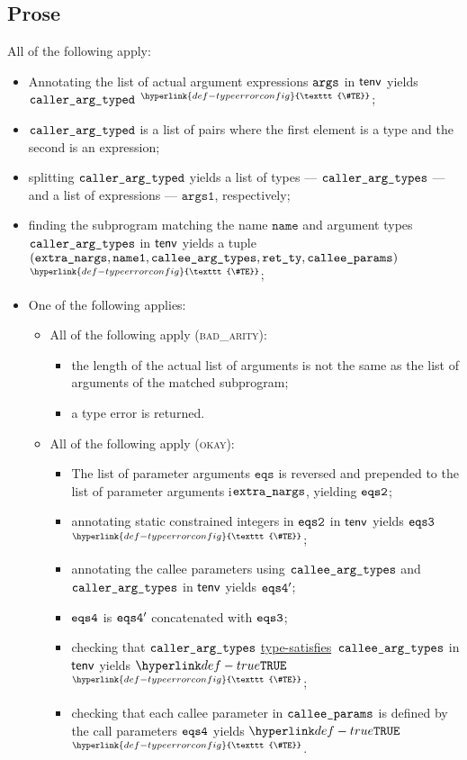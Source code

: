 \documentclass{book}
\newcommand\TypeErrorConfig[0]{\hyperlink{def-typeerrorconfig}{\texttt{\#TE}}}
\newcommand\ProseOrTypeError[0]{\hyperlink{def-proseortypeerror}{$^{\TypeErrorConfig}$}}
\newcommand\typesatisfies[0]{\hyperlink{def-typesatisfies}{type-satisfies}}
\newcommand\eqs[0]{\texttt{eqs}}
\newcommand\nameone[0]{\texttt{name1}}
\newcommand\vargsone[0]{\texttt{args1}}
\newcommand\name[0]{\texttt{name}}
\begin{document}
\subsection{Prose}
All of the following apply:
\begin{itemize}
  \item Annotating the list of actual argument expressions $\texttt{args}$ in $\textsf{tenv}$ yields \\ $\texttt{caller\_arg\_typed}$ \ProseOrTypeError;
  \item $\texttt{caller\_arg\_typed}$ is a list of pairs where the first element is a type and the second is an expression;
  \item splitting $\texttt{caller\_arg\_typed}$ yields a list of types --- $\texttt{caller\_arg\_types}$ --- and a list of expressions ---
  $\vargsone$, respectively;
  \item finding the subprogram matching the name $\name$ and argument types \\ $\texttt{caller\_arg\_types}$ in $\textsf{tenv}$
  yields a tuple \\ $(\extranargs, \nameone, \calleeargtypes, \retty, \calleeparams)$ \ProseOrTypeError;
  \item One of the following applies:
  \begin{itemize}
    \item All of the following apply (\textsc{bad\_arity}):
    \begin{itemize}
      \item the length of the actual list of arguments is not the same as the list of arguments of the matched
      subprogram;
      \item a type error is returned.
    \end{itemize}

    \item All of the following apply (\textsc{okay}):
    \begin{itemize}
      \item The list of parameter arguments $\eqs$ is reversed and prepended to the list of parameter arguments
      i$\texttt{extra\_nargs}$, yielding $\texttt{eqs2}$;
      \item annotating static constrained integers in $\texttt{eqs2}$ in $\textsf{tenv}$ yields $\texttt{eqs3}$ \ProseOrTypeError;
      \item annotating the callee parameters using $\texttt{callee\_arg\_types}$ and \\ $\texttt{caller\_arg\_types}$ in $\textsf{tenv}$
      yields $\texttt{eqs4}'$;
      \item $\texttt{eqs4}$ is $\texttt{eqs4}'$ concatenated with $\texttt{eqs3}$;
      \item checking that $\texttt{caller\_arg\_types}$ \typesatisfies\ $\texttt{callee\_arg\_types}$ in $\textsf{tenv}$ yields
      $\True$ \ProseOrTypeError;
      \item checking that each callee parameter in $\texttt{callee\_params}$ is defined by the call
      parameters $\texttt{eqs4}$ yields $\True$ \ProseOrTypeError.
    \end{itemize}
  \end{itemize}
\end{itemize}
\end{document}

